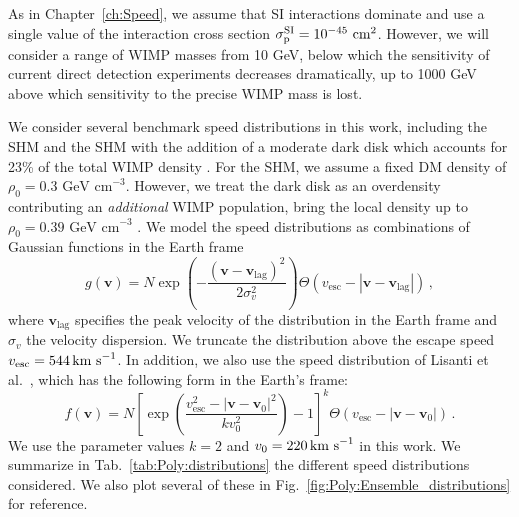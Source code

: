 As in Chapter~\ref{ch:Speed}, we assume that SI interactions dominate and use a single value of the interaction cross section $\sigmapsi = 10^{-45} \cmsq$. However, we will consider a range of WIMP masses from 10 GeV, below which the sensitivity of current direct detection experiments decreases dramatically, up to 1000 GeV above which sensitivity to the precise WIMP mass is lost. 

We consider several benchmark speed distributions in this work, including the SHM and the SHM with the addition of a moderate dark disk which accounts for 23\% of the total WIMP density \cite{Pillepich:2014}. For the SHM, we assume a fixed DM density of $\rho_0 = 0.3 \textrm{ GeV cm}^{-3}$. However, we treat the dark disk as an overdensity contributing an \textit{additional} WIMP population, bring the local density up to $\rho_0 = 0.39 \textrm{ GeV cm}^{-3}$ . We model the speed distributions as combinations of Gaussian functions in the Earth frame
\begin{equation}
\label{eq:gaussian}
g(\textbf{v}) = N \exp\left(-\frac{(\textbf{v} - \textbf{v}_\textrm{lag})^2}{2\sigma_v^2}\right) \Theta(v_\textrm{esc} - |\textbf{v} - \textbf{v}_\textrm{lag}|)\,,
\end{equation}
where $\textbf{v}_\textrm{lag}$ specifies the peak velocity of the distribution in the Earth frame and $\sigma_v$ the velocity dispersion. We truncate the distribution above the escape speed $v_\textrm{esc} = 544 \,\textrm{km s}^{-1}$. In addition, we also use the speed distribution of Lisanti et al.~\cite{Lisanti:2010}, which has the following form in the Earth's frame:
\begin{equation}
\label{eq:lisanti}
f(\textbf{v}) = N \left[\exp\left(\frac{v_\textrm{esc}^2 - |\textbf{v} - \textbf{v}_0|^2}{k v_0^2}\right) -1\right]^k \Theta(v_\textrm{esc} - |\textbf{v} - \textbf{v}_0|)\,.
\end{equation}
We use the parameter values $k = 2$ and $v_0 = 220 \,\textrm{km s}^{-1}$ in this work. We summarize in Tab.~\ref{tab:Poly:distributions} the different speed distributions considered. We also plot several of these in Fig.~\ref{fig:Poly:Ensemble_distributions} for reference. 

